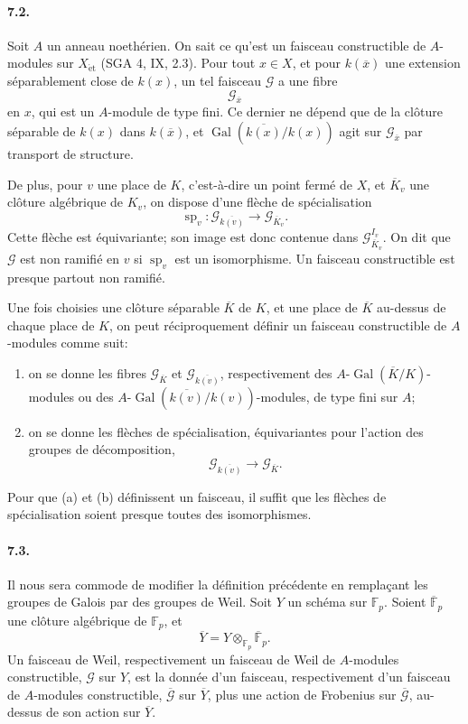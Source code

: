 \documentclass[10pt]{article}
\newcommand{\F}{\mathbb F}
\newcommand{\Gal}{\operatorname{Gal}}
\providecommand{\spc}{\operatorname{sp}}
\providecommand{\Gal}{\operatorname{Gal}}
\providecommand{\spc}{\operatorname{sp}}
\providecommand{\Gal}{\operatorname{Gal}}
\providecommand{\Gal}{\operatorname{Gal}}
\providecommand{\spc}{\operatorname{sp}}
\providecommand{\Gal}{\operatorname{Gal}}
\begin{document}
\paragraph{7.2.} Soit \(A\) un anneau noethérien. On sait ce qu'est un faisceau constructible de \(A\)-modules sur \(X_{\mathrm{\acute et}}\) (SGA 4, IX, 2.3). Pour tout \(x\in X\), et pour \(k(\overline x)\) une extension séparablement close de \(k(x)\), un tel faisceau \(\mathcal G\) a une fibre
\[
\mathcal G_{\overline x}
\]
en \(x\), qui est un \(A\)-module de type fini. Ce dernier ne dépend que de la clôture séparable de \(k(x)\) dans \(k(\overline x)\), et \(\Gal(\overline{k(x)}/k(x))\) agit sur \(\mathcal G_{\overline x}\) par transport de structure.

De plus, pour \(v\) une place de \(K\), c'est-à-dire un point fermé de \(X\), et \(\overline K_v\) une clôture algébrique de \(K_v\), on dispose d'une flèche de spécialisation
\[
\spc_v:\mathcal G_{\overline{k(v)}}\longrightarrow \mathcal G_{\overline K_v}.
\]
Cette flèche est équivariante; son image est donc contenue dans \(\mathcal G_{\overline K_v}^{I_v}\). On dit que \(\mathcal G\) est non ramifié en \(v\) si \(\spc_v\) est un isomorphisme. Un faisceau constructible est presque partout non ramifié.

Une fois choisies une clôture séparable \(\overline K\) de \(K\), et une place de \(\overline K\) au-dessus de chaque place de \(K\), on peut réciproquement définir un faisceau constructible de \(A\)-modules comme suit:
\begin{enumerate}[label=(\alph*)]
\item on se donne les fibres \(\mathcal G_{\overline K}\) et \(\mathcal G_{\overline{k(v)}}\), respectivement des \(A\)-\(\Gal(\overline K/K)\)-modules ou des \(A\)-\(\Gal(\overline{k(v)}/k(v))\)-modules, de type fini sur \(A\);
\item on se donne les flèches de spécialisation, équivariantes pour l'action des groupes de décomposition,
\[
\mathcal G_{\overline{k(v)}}\longrightarrow\mathcal G_{\overline K}.
\]
\end{enumerate}
Pour que (a) et (b) définissent un faisceau, il suffit que les flèches de spécialisation soient presque toutes des isomorphismes.

\paragraph{7.3.} Il nous sera commode de modifier la définition précédente en remplaçant les groupes de Galois par des groupes de Weil. Soit \(Y\) un schéma sur \(\F_p\). Soient \(\overline{\F}_p\) une clôture algébrique de \(\F_p\), et
\[
\overline Y=Y\otimes_{\F_p}\overline{\F}_p.
\]
Un faisceau de Weil, respectivement un faisceau de Weil de \(A\)-modules constructible, \(\mathcal G\) sur \(Y\), est la donnée d'un faisceau, respectivement d'un faisceau de \(A\)-modules constructible, \(\overline{\mathcal G}\) sur \(\overline Y\), plus une action de Frobenius sur \(\overline{\mathcal G}\), au-dessus de son action sur \(\overline Y\).
\end{document}
